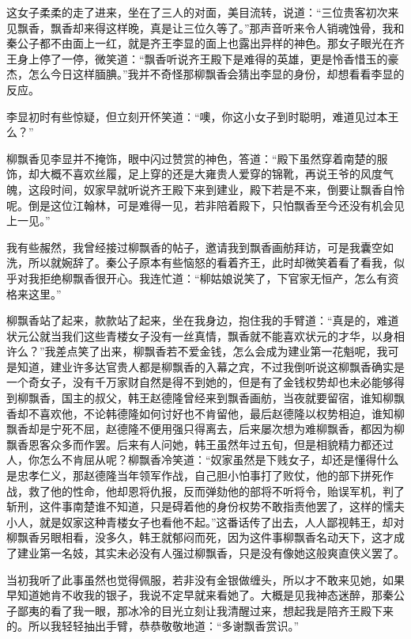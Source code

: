 这女子柔柔的走了进来，坐在了三人的对面，美目流转，说道：“三位贵客初次来见飘香，飘香却来得这样晚，真是让三位久等了。”那声音听来令人销魂蚀骨，我和秦公子都不由面上一红，就是齐王李显的面上也露出异样的神色。那女子眼光在齐王身上停了一停，微笑道：“飘香听说齐王殿下是难得的英雄，更是怜香惜玉的豪杰，怎么今日这样腼腆。”我并不奇怪那柳飘香会猜出李显的身份，却想看看李显的反应。

李显初时有些惊疑，但立刻开怀笑道：“噢，你这小女子到时聪明，难道见过本王么？”

柳飘香见李显并不掩饰，眼中闪过赞赏的神色，答道：“殿下虽然穿着南楚的服饰，却大概不喜欢丝履，足上穿的还是大雍贵人爱穿的锦靴，再说王爷的风度气魄，这段时间，奴家早就听说齐王殿下来到建业，殿下若是不来，倒要让飘香自怜呢。倒是这位江翰林，可是难得一见，若非陪着殿下，只怕飘香至今还没有机会见上一见。”

我有些赧然，我曾经接过柳飘香的帖子，邀请我到飘香画舫拜访，可是我囊空如洗，所以就婉辞了。秦公子原本有些恼怒的看着齐王，此时却微笑着看了看我，似乎对我拒绝柳飘香很开心。我连忙道：“柳姑娘说笑了，下官家无恒产，怎么有资格来这里。”

柳飘香站了起来，款款站了起来，坐在我身边，抱住我的手臂道：“真是的，难道状元公就当我们这些青楼女子没有一丝真情，飘香就不能喜欢状元的才华，以身相许么？”我差点笑了出来，柳飘香若不爱金钱，怎么会成为建业第一花魁呢，我可是知道，建业许多达官贵人都是柳飘香的入幕之宾，不过我倒听说这柳飘香确实是一个奇女子，没有千万家财自然是得不到她的，但是有了金钱权势却也未必能够得到柳飘香，国主的叔父，韩王赵德隆曾经来到飘香画舫，当夜就要留宿，谁知柳飘香却不喜欢他，不论韩德隆如何讨好也不肯留他，最后赵德隆以权势相迫，谁知柳飘香却是宁死不屈，赵德隆不便用强只得离去，后来屡次想为难柳飘香，都因为柳飘香恩客众多而作罢。后来有人问她，韩王虽然年过五旬，但是相貌精力都还过人，你怎么不肯屈从呢？柳飘香冷笑道：“奴家虽然是下贱女子，却还是懂得什么是忠孝仁义，那赵德隆当年领军作战，自己胆小怕事打了败仗，他的部下拼死作战，救了他的性命，他却恩将仇报，反而弹劾他的部将不听将令，贻误军机，判了斩刑，这件事南楚谁不知道，只是碍着他的身份权势不敢指责他罢了，这样的懦夫小人，就是奴家这种青楼女子也看他不起。”这番话传了出去，人人鄙视韩王，却对柳飘香另眼相看，没多久，韩王就郁闷而死，因为这件事柳飘香名动天下，这才成了建业第一名妓，其实未必没有人强过柳飘香，只是没有像她这般爽直侠义罢了。

当初我听了此事虽然也觉得佩服，若非没有金银做缠头，所以才不敢来见她，如果早知道她肯不收我的银子，我说不定早就来看她了。大概是见我神态迷醉，那秦公子鄙夷的看了我一眼，那冰冷的目光立刻让我清醒过来，想起我是陪齐王殿下来的。所以我轻轻抽出手臂，恭恭敬敬地道：“多谢飘香赏识。”


